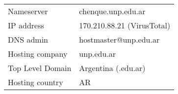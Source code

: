 \begin{longtable}[]{@{}ll@{}}
\begin{minipage}[t]{0.47\columnwidth}\raggedright
Nameserver\strut
\end{minipage} & \begin{minipage}[t]{0.47\columnwidth}\raggedright
chenque.unp.edu.ar\strut
\end{minipage}\tabularnewline
\begin{minipage}[t]{0.47\columnwidth}\raggedright
IP address\strut
\end{minipage} & \begin{minipage}[t]{0.47\columnwidth}\raggedright
170.210.88.21 (VirusTotal)\strut
\end{minipage}\tabularnewline
\begin{minipage}[t]{0.47\columnwidth}\raggedright
DNS admin\strut
\end{minipage} & \begin{minipage}[t]{0.47\columnwidth}\raggedright
hostmaster@unp.edu.ar\strut
\end{minipage}\tabularnewline
\begin{minipage}[t]{0.47\columnwidth}\raggedright
Hosting company\strut
\end{minipage} & \begin{minipage}[t]{0.47\columnwidth}\raggedright
unp.edu.ar\strut
\end{minipage}\tabularnewline
\begin{minipage}[t]{0.47\columnwidth}\raggedright
Top Level Domain\strut
\end{minipage} & \begin{minipage}[t]{0.47\columnwidth}\raggedright
Argentina (.edu.ar)\strut
\end{minipage}\tabularnewline
\begin{minipage}[t]{0.47\columnwidth}\raggedright
Hosting country\strut
\end{minipage} & \begin{minipage}[t]{0.47\columnwidth}\raggedright
AR\strut
\end{minipage}\tabularnewline
\bottomrule
\end{longtable}
